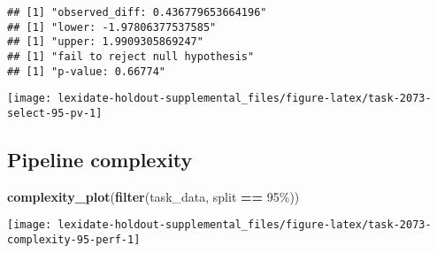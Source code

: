 \documentclass[
]{book}
\newenvironment{Shaded}{\begin{snugshade}}{\end{snugshade}}
\newcommand{\AttributeTok}[1]{\textcolor[rgb]{0.13,0.29,0.53}{#1}}
\newcommand{\DecValTok}[1]{\textcolor[rgb]{0.00,0.00,0.81}{#1}}
\newcommand{\FunctionTok}[1]{\textcolor[rgb]{0.13,0.29,0.53}{\textbf{#1}}}
\newcommand{\NormalTok}[1]{#1}
\newcommand{\OtherTok}[1]{\textcolor[rgb]{0.56,0.35,0.01}{#1}}
\newcommand{\SpecialCharTok}[1]{\textcolor[rgb]{0.81,0.36,0.00}{\textbf{#1}}}
\newcommand{\StringTok}[1]{\textcolor[rgb]{0.31,0.60,0.02}{#1}}
\begin{document}
\begin{Shaded}
\end{Shaded}

\begin{verbatim}
## [1] "observed_diff: 0.436779653664196"
## [1] "lower: -1.97806377537585"
## [1] "upper: 1.9909305869247"
## [1] "fail to reject null hypothesis"
## [1] "p-value: 0.66774"
\end{verbatim}

\texttt{[image: lexidate-holdout-supplemental\_files/figure-latex/task-2073-select-95-pv-1]}

\hypertarget{pipeline-complexity-42}{%
\subsection{Pipeline complexity}\label{pipeline-complexity-42}}

\begin{Shaded}
\begin{Highlighting}[]
\FunctionTok{complexity\_plot}\NormalTok{(}\FunctionTok{filter}\NormalTok{(task\_data, split }\SpecialCharTok{==} \StringTok{\textquotesingle{}95\%\textquotesingle{}}\NormalTok{))}
\end{Highlighting}
\end{Shaded}

\texttt{[image: lexidate-holdout-supplemental\_files/figure-latex/task-2073-complexity-95-perf-1]}
\end{document}
